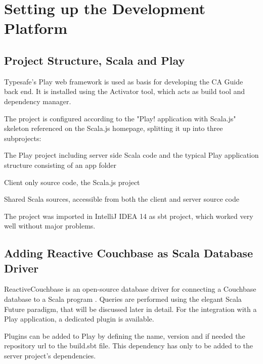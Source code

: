 \section{Setting up the Development Platform}

\subsection{Project Structure, Scala and Play}

Typesafe's Play web framework %
 is used as basis for developing the CA Guide back end. It is installed using the Activator tool, which acts as build tool and dependency manager.
 
The project is configured according to the "Play! application with Scala.js" skeleton \cite{playscalajs} referenced on the Scala.js homepage, splitting it up into three subprojects:

\begin{description}[leftmargin=!,labelwidth=\widthof{\bfseries editor-server}]
\item[$\bullet$ editor-server] The Play project including server side Scala code and the typical Play application structure consisting of an app folder
\item[$\bullet$ editor-client] Client only source code, the Scala.js project
\item[$\bullet$ editor-shared] Shared Scala sources, accessible from both the client and server source code
\end{description} 
 
The project was imported in IntelliJ IDEA 14 as sbt project, which worked very well without major problems.

\subsection{Adding Reactive Couchbase as Scala Database Driver}

ReactiveCouchbase is an open-source database driver for connecting a Couchbase database to a Scala program \cite{reactivecouchbase}. Queries are performed using the elegant Scala Future paradigm, that will be discussed later in detail. For the integration with a Play application, a dedicated plugin is available.

Plugins can be added to Play by defining the name, version and if needed the repository url to the build.sbt file. This dependency has only to be added to the server project's dependencies.

